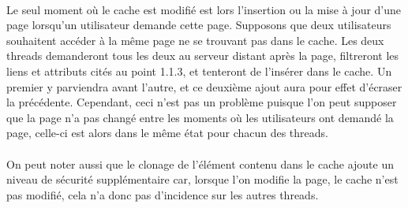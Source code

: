 \documentclass[a4paper,11pt]{article}
\begin{document}
\paragraph{}
Le seul moment où le cache est modifié est lors l'insertion ou la mise à jour d'une page lorsqu'un utilisateur demande cette page. Supposons que deux utilisateurs souhaitent accéder à la même page ne se trouvant pas dans le cache. Les deux threads demanderont tous les deux au serveur distant après la page, filtreront les liens et attributs cités au point 1.1.3, et tenteront de l'insérer dans le cache. Un premier y parviendra avant l'autre, et ce deuxième ajout aura pour effet d'écraser la précédente. Cependant, ceci n'est pas un problème puisque l'on peut supposer que la page n'a pas changé entre les moments où les utilisateurs ont demandé la page, celle-ci est alors dans le même état pour chacun des threads.
\paragraph{}
On peut noter aussi que le clonage de l'élément contenu dans le cache ajoute un niveau de sécurité supplémentaire car, lorsque l'on modifie la page, le cache n'est pas modifié, cela n'a donc pas d'incidence sur les autres threads.
\end{document}
